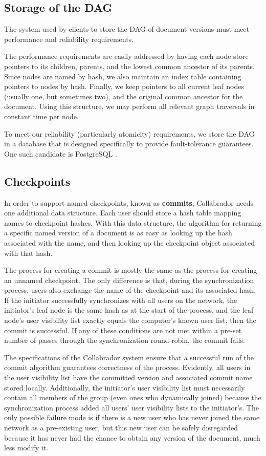 \documentclass[11pt,titlepage]{article}
\begin{document}
\subsection{Storage of the DAG}

The system used by clients to store the DAG of document versions must
meet performance and reliability requirements.

The performance requirements are easily addressed by having each node
store pointers to its children, parents, and the lowest common
ancestor of its parents.  Since nodes are named by hash, we also
maintain an index table containing pointers to nodes by hash.
Finally, we keep pointers to all current leaf nodes (usually one, but
sometimes two), and the original common ancestor for the document.
Using this structure, we may perform all relevant graph traversals in
constant time per node.

To meet our reliability (particularly atomicity) requirements, we
store the DAG in a database that is designed specifically to provide
fault-tolerance guarantees.  One such candidate is PostgreSQL
\cite{postgres}.

\subsection{Checkpoints}

In order to support named checkpoints, known as \textbf{commits},
Collabrador needs one additional data structure. Each user should
store a hash table mapping names to checkpoint hashes. With this data
structure, the algorithm for returning a specific named version of a
document is as easy as looking up the hash associated with the name,
and then looking up the checkpoint object associated with that hash.

The process for creating a commit is mostly the same as the process
for creating an unnamed checkpoint. The only difference is that,
during the synchronization process, users also exchange the name of
the checkpoint and its associated hash. If the initiator successfully
synchronizes with all users on the network, the initiator's leaf node
is the same hash as at the start of the process, and the leaf node's
user visibility list exactly equals the computer's known user list,
then the commit is successful. If any of these conditions are not met
within a pre-set number of passes through the synchronization
round-robin, the commit fails.

The specifications of the Collabrador system ensure that a successful
run of the commit algorithm guarantees correctness of the
process. Evidently, all users in the user visibility list have the
committed version and associated commit name stored
locally. Additionally, the initiator's user visibility list must
necessarily contain all members of the group (even ones who
dynamically joined) because the synchronization process added all
users' user visibility lists to the initiator's. The only possible
failure mode is if there is a new user who has never joined the same
network as a pre-existing user, but this new user can be safely
disregarded because it has never had the chance to obtain any version
of the document, much less modify it.
\end{document}
